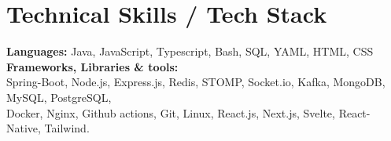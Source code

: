 \documentclass[9.5pt,a4paper]{article}
\begin{document}
\section*{Technical Skills / Tech Stack}
\textbf{Languages:} Java, JavaScript, Typescript, Bash, SQL, YAML, HTML, CSS \\
\textbf{Frameworks, Libraries \& tools:} \\
Spring-Boot, Node.js, Express.js, Redis, STOMP, Socket.io, Kafka, MongoDB, MySQL, PostgreSQL, \\
Docker, Nginx, Github actions, Git, Linux, React.js, Next.js, Svelte, React-Native, Tailwind.

\end{document}
